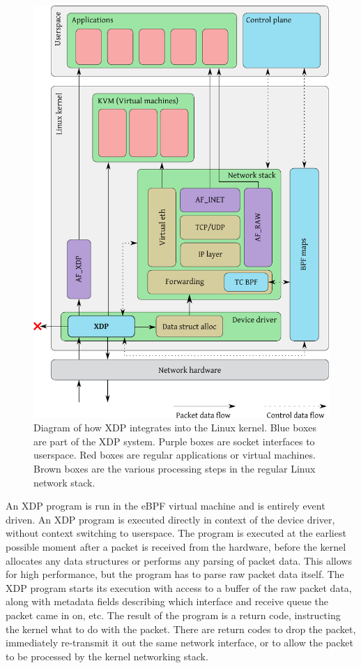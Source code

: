 \documentclass[10pt]{sig-alternate-05-2015}
\begin{document}
\begin{figure}[t]
\centering
\includegraphics[width=\linewidth]{figures/kernel-diagram.pdf}
\caption{\label{fig:xdp-kernel}
Diagram of how XDP integrates into the Linux kernel. Blue boxes are part of the XDP system. Purple boxes are socket interfaces to userspace. Red boxes are regular applications or virtual machines. Brown boxes are the various processing steps in the regular Linux network stack.}
\end{figure}

An XDP program is run in the eBPF virtual machine and is entirely event driven.
An XDP program is executed directly in context of the device driver, without
context switching to userspace. The program is executed at the earliest possible
moment after a packet is received from the hardware, before the kernel allocates
any data structures or performs any parsing of packet data. This allows for high
performance, but the program has to parse raw packet data itself. The XDP
program starts its execution with access to a buffer of the raw packet data,
along with metadata fields describing which interface and receive queue the
packet came in on, etc. The result of the program is a return code, instructing
the kernel what to do with the packet. There are return codes to drop the
packet, immediately re-transmit it out the same network interface, or to allow
the packet to be processed by the kernel networking stack.
\end{document}
